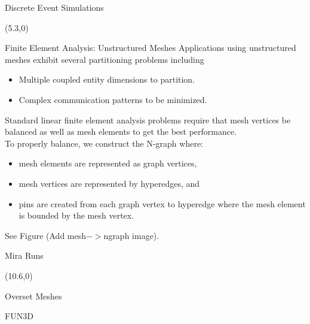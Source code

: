 \documentclass{beamer}
\begin{document}
\begin{textblock}{15.6}
\begin{textblock}{5}
\begin{block}{Discrete Event Simulations}
          \end{block}
        \end{textblock}
        \begin{textblock}{5}(5.3,0)
          \begin{block}{Finite Element Analysis: Unstructured Meshes}
            Applications using unstructured meshes exhibit several partitioning problems including
            \begin{itemize}
            \item Multiple coupled entity dimensions to partition.
            \item Complex communication patterns to be minimized.
            \end{itemize}
            Standard linear finite element analysis problems require that mesh vertices be balanced as well as mesh elements to get the best performance.\\
            To properly balance, we construct the N-graph where:
            \begin{itemize}
              \item mesh elements are represented as graph vertices,
              \item mesh vertices are represented by hyperedges, and
              \item pins are created from each graph vertex to hyperedge where the mesh element is bounded by the mesh vertex.
            \end{itemize}
            See Figure (Add mesh$->$ngraph image).
          \end{block}
          \begin{block}{Mira Runs}
            
          \end{block}
        \end{textblock}
        \begin{textblock}{5}(10.6,0)
          \begin{block}{Overset Meshes}
            
          \end{block}
          \begin{block}{FUN3D}

          \end{block}
        \end{textblock}
      \end{textblock}
\end{document}
